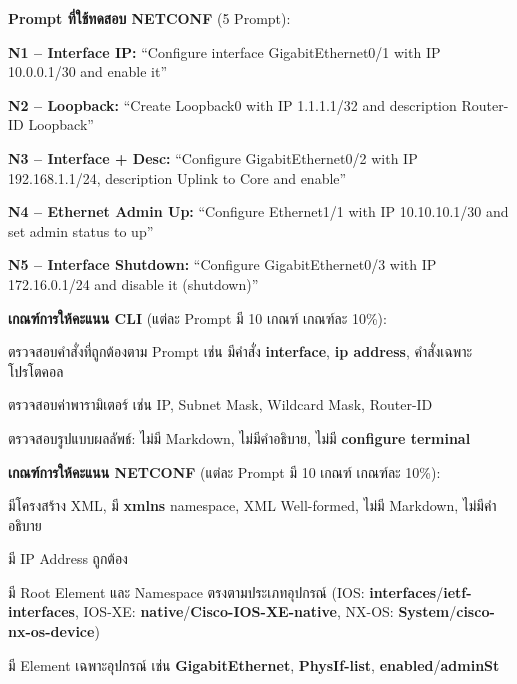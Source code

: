 \hspace*{1.3em}
\textbf{Prompt ที่ใช้ทดสอบ NETCONF} (5 Prompt):
\begin{mycustomitem2}
    \item \textbf{N1 -- Interface IP:} ``Configure interface GigabitEthernet0/1 with IP 10.0.0.1/30 and enable it''
    \item \textbf{N2 -- Loopback:} ``Create Loopback0 with IP 1.1.1.1/32 and description Router-ID Loopback''
    \item \textbf{N3 -- Interface + Desc:} ``Configure GigabitEthernet0/2 with IP 192.168.1.1/24, description Uplink to Core and enable''
    \item \textbf{N4 -- Ethernet Admin Up:} ``Configure Ethernet1/1 with IP 10.10.10.1/30 and set admin status to up''
    \item \textbf{N5 -- Interface Shutdown:} ``Configure GigabitEthernet0/3 with IP 172.16.0.1/24 and disable it (shutdown)''
\end{mycustomitem2}

\hspace*{1.3em}
\textbf{เกณฑ์การให้คะแนน CLI} (แต่ละ Prompt มี 10 เกณฑ์ เกณฑ์ละ 10\%):
\begin{mycustomitem2}
    \item ตรวจสอบคำสั่งที่ถูกต้องตาม Prompt เช่น มีคำสั่ง \textbf{interface}, \textbf{ip address}, คำสั่งเฉพาะโปรโตคอล
    \item ตรวจสอบค่าพารามิเตอร์ เช่น IP, Subnet Mask, Wildcard Mask, Router-ID
    \item ตรวจสอบรูปแบบผลลัพธ์: ไม่มี Markdown, ไม่มีคำอธิบาย, ไม่มี \textbf{configure terminal}
\end{mycustomitem2}

\hspace*{1.3em}
\textbf{เกณฑ์การให้คะแนน NETCONF} (แต่ละ Prompt มี 10 เกณฑ์ เกณฑ์ละ 10\%):
\begin{mycustomitem2}
    \item มีโครงสร้าง XML, มี \textbf{xmlns} namespace, XML Well-formed, ไม่มี Markdown, ไม่มีคำอธิบาย
    \item มี IP Address ถูกต้อง
    \item มี Root Element และ Namespace ตรงตามประเภทอุปกรณ์ (IOS: \textbf{interfaces}/\textbf{ietf-interfaces}, IOS-XE: \textbf{native}/\textbf{Cisco-IOS-XE-native}, NX-OS: \textbf{System}/\textbf{cisco-nx-os-device})
    \item มี Element เฉพาะอุปกรณ์ เช่น \textbf{GigabitEthernet}, \textbf{PhysIf-list}, \textbf{enabled}/\textbf{adminSt}
\end{mycustomitem2}

